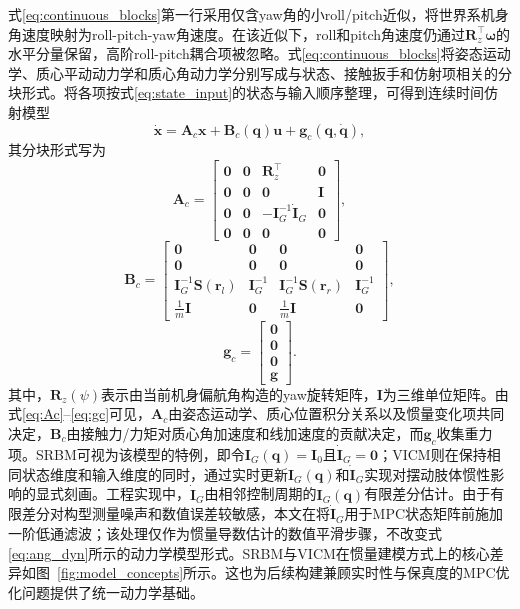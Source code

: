 ﻿\documentclass[preprint,12pt]{elsarticle}
\begin{document}
式\eqref{eq:continuous_blocks}第一行采用仅含yaw角的小roll/pitch近似，将世界系机身角速度映射为roll-pitch-yaw角速度。在该近似下，roll和pitch角速度仍通过$\bm R_z^\top\bm\omega$的水平分量保留，高阶roll-pitch耦合项被忽略。式\eqref{eq:continuous_blocks}将姿态运动学、质心平动动力学和质心角动力学分别写成与状态、接触扳手和仿射项相关的分块形式。将各项按式\eqref{eq:state_input}的状态与输入顺序整理，可得到连续时间仿射模型
\begin{equation}
\dot{\bm x}=\bm A_c\bm x+\bm B_c(\bm q)\bm u+\bm g_c(\bm q,\dot{\bm q}),
\label{eq:affine}
\end{equation}
其分块形式写为\begin{equation}
\bm A_c=
\begin{bmatrix}
\bm 0 & \bm 0 & \bm R_z^\top & \bm 0\\
\bm 0 & \bm 0 & \bm 0 & \bm I\\
\bm 0 & \bm 0 & -\bm I_G^{-1}\dot{\bm I}_G & \bm 0\\
\bm 0 & \bm 0 & \bm 0 & \bm 0
\end{bmatrix},
\label{eq:Ac}
\end{equation}
\begin{equation}
\bm B_c=
\begin{bmatrix}
\bm 0 & \bm 0 & \bm 0 & \bm 0\\
\bm 0 & \bm 0 & \bm 0 & \bm 0\\
\bm I_G^{-1}\bm S(\bm r_l) & \bm I_G^{-1} & \bm I_G^{-1}\bm S(\bm r_r) & \bm I_G^{-1}\\
\frac{1}{m}\bm I & \bm 0 & \frac{1}{m}\bm I & \bm 0
\end{bmatrix},
\label{eq:Bc}
\end{equation}
\begin{equation}
\bm g_c=
\begin{bmatrix}
\bm 0\\ \bm 0\\ \bm 0\\ \bm g
\end{bmatrix}.
\label{eq:gc}
\end{equation}
其中，$\bm R_z(\psi)$表示由当前机身偏航角构造的yaw旋转矩阵，$\bm I$为三维单位矩阵。由式\eqref{eq:Ac}--\eqref{eq:gc}可见，$\bm A_c$由姿态运动学、质心位置积分关系以及惯量变化项共同决定，$\bm B_c$由接触力/力矩对质心角加速度和线加速度的贡献决定，而$\bm g_c$收集重力项。SRBM可视为该模型的特例，即令$\bm I_G(\bm q)=\bm I_0$且$\dot{\bm I}_G=\bm 0$；VICM则在保持相同状态维度和输入维度的同时，通过实时更新$\bm I_G(\bm q)$和$\dot{\bm I}_G$实现对摆动肢体惯性影响的显式刻画。工程实现中，$\dot{\bm I}_G$由相邻控制周期的$\bm I_G(\bm q)$有限差分估计。由于有限差分对构型测量噪声和数值误差较敏感，本文在将$\dot{\bm I}_G$用于MPC状态矩阵前施加一阶低通滤波；该处理仅作为惯量导数估计的数值平滑步骤，不改变式\eqref{eq:ang_dyn}所示的动力学模型形式。SRBM与VICM在惯量建模方式上的核心差异如图~\ref{fig:model_concepts}所示。这也为后续构建兼顾实时性与保真度的MPC优化问题提供了统一动力学基础。
\end{document}
